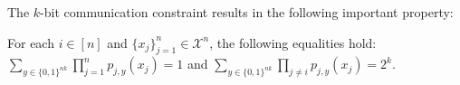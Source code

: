\documentclass[final,12pt]{colt2018} %
\def \bP {\mathbb{P}}
\newcommand{\calX}{{\mathcal{X}}}
\newtheorem*{multinomial}{Multinomial Observation Model}
\begin{document}
The $k$-bit communication constraint results in the following important property: 
\begin{lemma}\label{lemma.total_weight}
	For each $i\in [n]$ and $\{x_j\}_{j=1}^n\in \calX^n$, the following equalities hold: 
$
	\sum_{y\in \{0,1\}^{nk}} \prod_{j=1}^n p_{j,y}(x_j) = 1$ and $\sum_{y\in \{0,1\}^{nk}} \prod_{j\neq i} p_{j,y}(x_j) = 2^k. 
$
\end{lemma}


\end{document}
